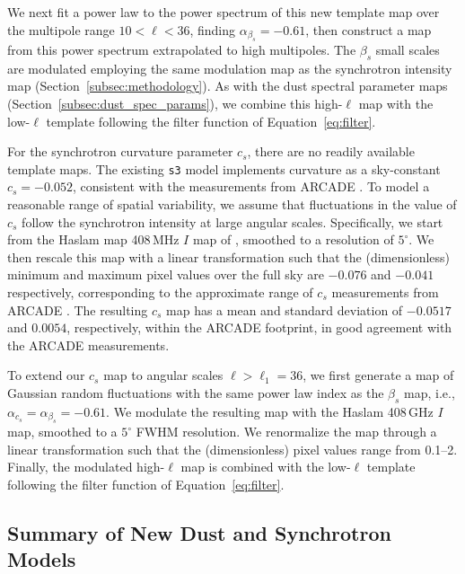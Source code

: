 \documentclass[twocolumn]{aastex631}
\begin{document}
We next fit a power law to the power spectrum of this new template map over the multipole range $10 < \ell < 36$, finding $\alpha_{\beta_s}=-0.61$, then construct a map from this power spectrum extrapolated to high multipoles. The $\beta_s$ small scales are modulated employing the same modulation map as the synchrotron intensity map (Section~\ref{subsec:methodology}). As with the dust spectral parameter maps (Section~\ref{subsec:dust_spec_params}), we combine this high-$\ell$ map with the low-$\ell$ template following the filter function of Equation~\ref{eq:filter}.
 
For the synchrotron curvature parameter $c_s$, there are no readily available template maps. The existing \texttt{s3} model implements curvature as a sky-constant $c_s = -0.052$, consistent with the measurements from ARCADE \citep[$c_s=-0.052 \pm 0.005$,][]{Kogut:2012}. To model a reasonable range of spatial variability, we assume that fluctuations in the value of $c_s$ follow the synchrotron intensity at large angular scales. Specifically, we start from the Haslam map 408\,MHz $I$ map of \citet{Remazeilles:2015}, smoothed to a resolution of $5^\circ$. We then rescale this map with a linear transformation such that the (dimensionless) minimum and maximum pixel values over the full sky are $-0.076$ and $-0.041$ respectively, corresponding to the approximate range of $c_s$ measurements from ARCADE \citep[][Figure~6]{Kogut:2012}. The resulting $c_s$ map has a mean and standard deviation of $-0.0517$ and $0.0054$, respectively, within the ARCADE footprint, in good agreement with the ARCADE measurements.

To extend our $c_s$ map to angular scales $\ell > \ell_1 = 36$, we first generate a map of Gaussian random fluctuations with the same power law index as the $\beta_s$ map, i.e., $\alpha _{c_s}=\alpha _{\beta_s} = -0.61$. We modulate the resulting map with the Haslam 408\,GHz $I$ map, smoothed to a $5^\circ$ FWHM resolution. We renormalize the map through a linear transformation such that the (dimensionless) pixel values range from 0.1--2. Finally, the modulated high-$\ell$ map is combined with the low-$\ell$ template following the filter function of Equation~\ref{eq:filter}.

\subsection{Summary of New Dust and Synchrotron Models}
\end{document}
